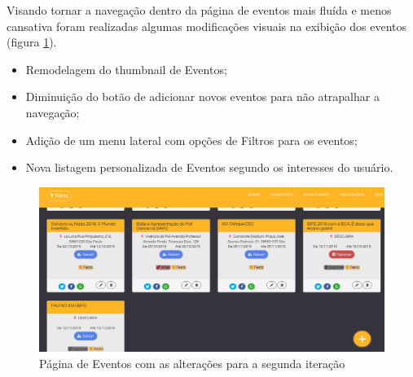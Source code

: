 \par Visando tornar a navegação dentro da página de eventos mais fluída e menos cansativa foram realizadas algumas modificações visuais na exibição dos eventos (figura \ref{fig:events_pagev2}).
\begin{itemize}
\item Remodelagem do thumbnail de Eventos;
\item Diminuição do botão de adicionar novos eventos para não atrapalhar a navegação;
\item Adição de um menu lateral com opções de Filtros para os eventos;
\item Nova listagem personalizada de Eventos segundo os interesses do usuário.
\end{itemize}
        \begin{figure}[htb]
        \centering
		\includegraphics[width=15cm]{figuras/events_pagev2}
		\caption{\label{fig:events_pagev2} Página de Eventos com as alterações para a segunda iteração}
		\end{figure}

